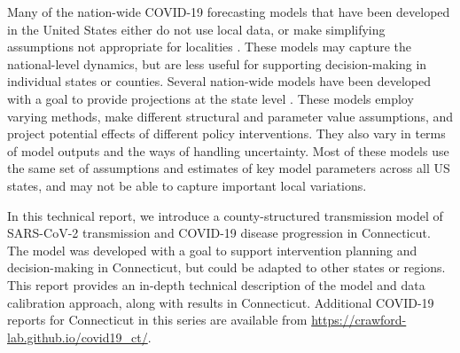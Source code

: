 \documentclass[11pt]{article}
\begin{document}
Many of the nation-wide COVID-19 forecasting models that have been developed in the United States either do not use local data, or make simplifying assumptions not appropriate for localities \citep{cdc2020covid19forecasts}. These models may capture the national-level dynamics, but are less useful for supporting decision-making in individual states or counties. 
Several nation-wide models have been developed with a goal to provide projections at the state level \citep{imperial2020state, covidactnow2020you, gleam2020projections, columbia2020projections, ihme2020projections, losalamos2020projections, mit2020projections, ucla2020projections, umassamherst2020projections, utaustin2020projections, yyg2020projections}. 
These models employ varying methods, make different structural and parameter value assumptions, and project potential effects of different policy interventions. They also vary in terms of model outputs and the ways of handling uncertainty. Most of these models use the same set of assumptions and estimates of key model parameters across all US states, and may not be able to capture important local variations. 

In this technical report, we introduce a county-structured transmission model of SARS-CoV-2 transmission and COVID-19 disease progression in Connecticut.  The model was developed with a goal to support intervention planning and decision-making in Connecticut, but could be adapted to other states or regions.  This report provides an in-depth technical description of the model and data calibration approach, along with results in Connecticut.  Additional COVID-19 reports for Connecticut in this series are available from \url{https://crawford-lab.github.io/covid19_ct/}. 

\end{document}
